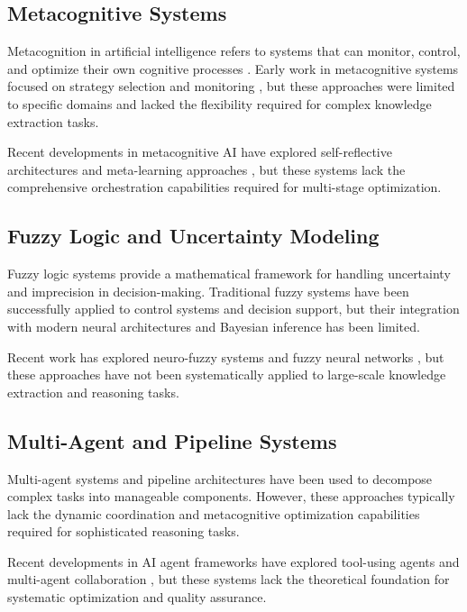 \documentclass[12pt,a4paper]{article}
\begin{document}
\subsection{Metacognitive Systems}

Metacognition in artificial intelligence refers to systems that can monitor, control, and optimize their own cognitive processes \cite{cox2005metacognition}. Early work in metacognitive systems focused on strategy selection and monitoring \cite{anderson1996act}, but these approaches were limited to specific domains and lacked the flexibility required for complex knowledge extraction tasks.

Recent developments in metacognitive AI have explored self-reflective architectures \cite{shinn2023reflexion} and meta-learning approaches \cite{finn2017model}, but these systems lack the comprehensive orchestration capabilities required for multi-stage optimization.

\subsection{Fuzzy Logic and Uncertainty Modeling}

Fuzzy logic systems \cite{zadeh1965fuzzy} provide a mathematical framework for handling uncertainty and imprecision in decision-making. Traditional fuzzy systems have been successfully applied to control systems and decision support, but their integration with modern neural architectures and Bayesian inference has been limited.

Recent work has explored neuro-fuzzy systems \cite{jang1993anfis} and fuzzy neural networks \cite{buckley1992fuzzy}, but these approaches have not been systematically applied to large-scale knowledge extraction and reasoning tasks.

\subsection{Multi-Agent and Pipeline Systems}

Multi-agent systems \cite{wooldridge2009introduction} and pipeline architectures \cite{dean2008mapreduce} have been used to decompose complex tasks into manageable components. However, these approaches typically lack the dynamic coordination and metacognitive optimization capabilities required for sophisticated reasoning tasks.

Recent developments in AI agent frameworks have explored tool-using agents \cite{schick2023toolformer} and multi-agent collaboration \cite{park2023generative}, but these systems lack the theoretical foundation for systematic optimization and quality assurance.
\end{document}

